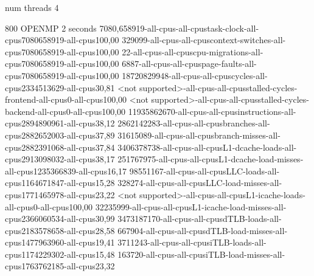 num threads 4

800
OPENMP
2 seconds
7080,658919-all-cpus-all-cpustask-clock-all-cpus7080658919-all-cpus100,00
329099-all-cpus-all-cpuscontext-switches-all-cpus7080658919-all-cpus100,00
22-all-cpus-all-cpuscpu-migrations-all-cpus7080658919-all-cpus100,00
6887-all-cpus-all-cpuspage-faults-all-cpus7080658919-all-cpus100,00
18720829948-all-cpus-all-cpuscycles-all-cpus2334513629-all-cpus30,81
<not supported>-all-cpus-all-cpusstalled-cycles-frontend-all-cpus0-all-cpus100,00
<not supported>-all-cpus-all-cpusstalled-cycles-backend-all-cpus0-all-cpus100,00
11935862670-all-cpus-all-cpusinstructions-all-cpus2894890961-all-cpus38,12
2862142283-all-cpus-all-cpusbranches-all-cpus2882652003-all-cpus37,89
31615089-all-cpus-all-cpusbranch-misses-all-cpus2882391068-all-cpus37,84
3406378738-all-cpus-all-cpusL1-dcache-loads-all-cpus2913098032-all-cpus38,17
251767975-all-cpus-all-cpusL1-dcache-load-misses-all-cpus1235366839-all-cpus16,17
98551167-all-cpus-all-cpusLLC-loads-all-cpus1164671847-all-cpus15,28
328274-all-cpus-all-cpusLLC-load-misses-all-cpus1771465978-all-cpus23,22
<not supported>-all-cpus-all-cpusL1-icache-loads-all-cpus0-all-cpus100,00
32235999-all-cpus-all-cpusL1-icache-load-misses-all-cpus2366060534-all-cpus30,99
3473187170-all-cpus-all-cpusdTLB-loads-all-cpus2183578658-all-cpus28,58
667904-all-cpus-all-cpusdTLB-load-misses-all-cpus1477963960-all-cpus19,41
3711243-all-cpus-all-cpusiTLB-loads-all-cpus1174229302-all-cpus15,48
163720-all-cpus-all-cpusiTLB-load-misses-all-cpus1763762185-all-cpus23,32
